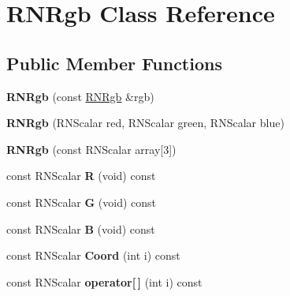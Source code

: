 \hypertarget{class_r_n_rgb}{}\section{R\+N\+Rgb Class Reference}
\label{class_r_n_rgb}
\subsection*{Public Member Functions}
\begin{DoxyCompactItemize}
\item 
{\bfseries R\+N\+Rgb} (const \hyperlink{class_r_n_rgb}{R\+N\+Rgb} \&rgb)\hypertarget{class_r_n_rgb_a87fc0332057d025e895feb8275fff4d9}{}\label{class_r_n_rgb_a87fc0332057d025e895feb8275fff4d9}

\item 
{\bfseries R\+N\+Rgb} (R\+N\+Scalar red, R\+N\+Scalar green, R\+N\+Scalar blue)\hypertarget{class_r_n_rgb_a5036ea50059a94fdf2f1423135dfb552}{}\label{class_r_n_rgb_a5036ea50059a94fdf2f1423135dfb552}

\item 
{\bfseries R\+N\+Rgb} (const R\+N\+Scalar array\mbox{[}3\mbox{]})\hypertarget{class_r_n_rgb_a8b04f296472f91ea18579a30fa479e74}{}\label{class_r_n_rgb_a8b04f296472f91ea18579a30fa479e74}

\item 
const R\+N\+Scalar {\bfseries R} (void) const \hypertarget{class_r_n_rgb_a0eb13bef004247298baf91e8ecbf5501}{}\label{class_r_n_rgb_a0eb13bef004247298baf91e8ecbf5501}

\item 
const R\+N\+Scalar {\bfseries G} (void) const \hypertarget{class_r_n_rgb_ab89b3b91779a5ccacdd1e4810f6c75f5}{}\label{class_r_n_rgb_ab89b3b91779a5ccacdd1e4810f6c75f5}

\item 
const R\+N\+Scalar {\bfseries B} (void) const \hypertarget{class_r_n_rgb_a8721692748e13d7c4d6413977e6e52a0}{}\label{class_r_n_rgb_a8721692748e13d7c4d6413977e6e52a0}

\item 
const R\+N\+Scalar {\bfseries Coord} (int i) const \hypertarget{class_r_n_rgb_a99609b2d7d03de088952ffd5099d3b1a}{}\label{class_r_n_rgb_a99609b2d7d03de088952ffd5099d3b1a}

\item 
const R\+N\+Scalar {\bfseries operator\mbox{[}$\,$\mbox{]}} (int i) const \hypertarget{class_r_n_rgb_a7e78b1d70cc1520f8d1016eef816d59b}{}\label{class_r_n_rgb_a7e78b1d70cc1520f8d1016eef816d59b}


\end{DoxyCompactItemize}
